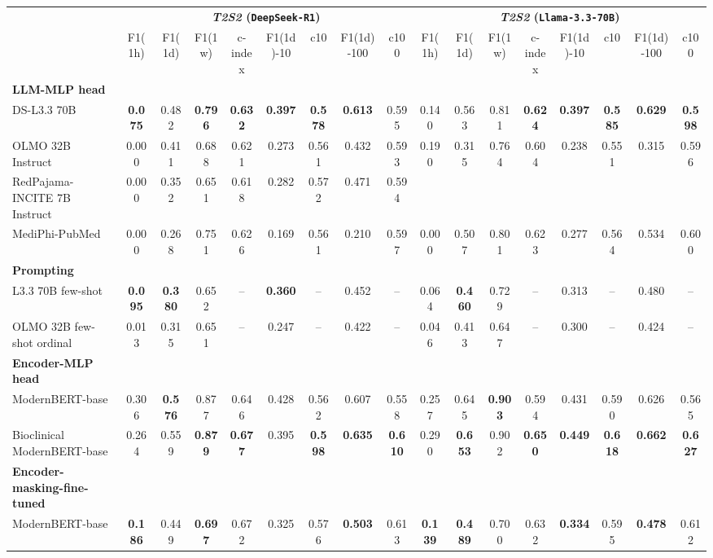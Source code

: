 \begin{table}[htbp]
\begin{ChSevenFloatBody}
\centering
\resizebox{\linewidth}{!}
{
\begin{tabular}{lcccccccc|cccccccc}
\toprule
& \multicolumn{8}{c|}{\textbf{\textit{T2S2} (\texttt{DeepSeek-R1})}} & \multicolumn{8}{c}{\textbf{\textit{T2S2} (\texttt{Llama-3.3-70B})}} \\
& F1(1h) & F1(1d) & F1(1w) & c-index & F1(1d)-10 & c10 & F1(1d)-100 & c100 & F1(1h) & F1(1d) & F1(1w) & c-index & F1(1d)-10 & c10 & F1(1d)-100 & c100 \\
\hline
\textbf{LLM-MLP head} &&&&&&&&&&&&&&&&\\
DS-L3.3 70B & \textbf{0.075} & 0.482 & \textbf{0.796} & \textbf{0.632} & \textbf{0.397} & \textbf{0.578} & \textbf{0.613} & 0.595 & 0.140 & 0.563 & 0.811 & \textbf{0.624} & \textbf{0.397} & \textbf{0.585} & \textbf{0.629} & \textbf{0.598} \\
OLMO 32B Instruct & 0.000 & 0.411 & 0.688 & 0.621 & 0.273 & 0.561 & 0.432 & 0.593 & 0.190 & 0.315 & 0.764 & 0.604 & 0.238 & 0.551 & 0.315 & 0.596 \\
RedPajama-INCITE 7B Instruct & 0.000 & 0.352 & 0.651 & 0.618 & 0.282 & 0.572 & 0.471 & 0.594 \\
MediPhi-PubMed & 0.000 & 0.268 & 0.751 & 0.626 & 0.169 & 0.561 & 0.210 & 0.597 & 0.000 & 0.507 & 0.801 & 0.623 & 0.277 & 0.564 & 0.534 & 0.600 \\ 
\textbf{Prompting} &&&&&&&&&&&&&&&&\\
L3.3 70B few-shot & \textbf{0.095} & \textbf{0.380} & 0.652 & -- & \textbf{0.360} & -- & 0.452 & -- & 0.064 & \textbf{0.460} & 0.729 & -- & 0.313 & -- & 0.480 & -- \\
OLMO 32B few-shot ordinal & 0.013 & 0.315 & 0.651 & -- & 0.247 & -- & 0.422 & -- & 0.046 & 0.413 & 0.647 & -- & 0.300 & -- & 0.424 & -- \\
\hline
\textbf{Encoder-MLP head} &&&&&&&&&&&&&&&&\\
ModernBERT-base & 0.306 & \textbf{0.576} & 0.877 & 0.646 & 0.428 & 0.562 & 0.607 & 0.558 & 0.257 & 0.645 & \textbf{0.903} & 0.594 & 0.431 & 0.590 & 0.626 & 0.565 \\
Bioclinical ModernBERT-base & 0.264 & 0.559 & \textbf{0.879} & \textbf{0.677} & 0.395 & \textbf{0.598} & \textbf{0.635} & \textbf{0.610} & 0.290 & \textbf{0.653} & 0.902 & \textbf{0.650}
& \textbf{0.449} & \textbf{0.618} & \textbf{0.662} & \textbf{0.627} \\ 
\hline
\textbf{Encoder-masking-fine-tuned} &&&&&&&&&&&&&&&&\\
ModernBERT-base & \textbf{0.186} & 0.449 & \textbf{0.697} & 0.672 & 0.325 & 0.576 & \textbf{0.503} & 0.613 & \textbf{0.139} & \textbf{0.489} & 0.700 & 0.632 & \textbf{0.334} & 0.595 & \textbf{0.478} & 0.612 \\

\end{tabular}}
\end{ChSevenFloatBody}
\end{table}
